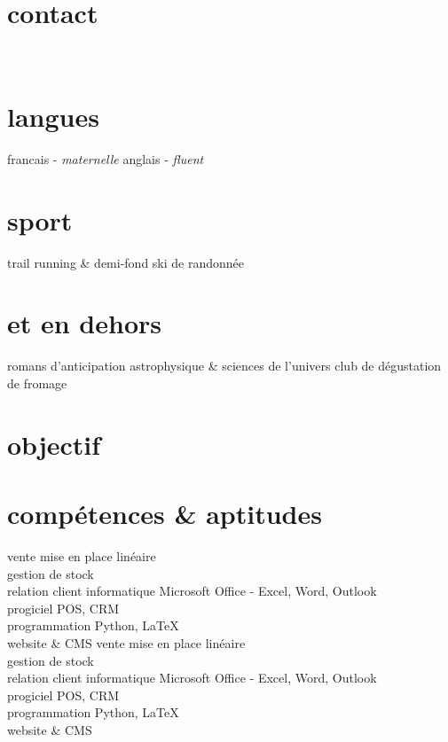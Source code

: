 \documentclass[]{farangoth-cv}
\begin{document}
\makeheader{}

\begin{aside}
  \section{contact}\label{sec:about}
  \myPhoneNumber{}
  ~
  \href{mailto:\myMail}{\myMail}
  \href{\myLinkedin}{}
  ~
  \myAddress{}

  \section{langues}
  francais \-- \emph{maternelle}
  anglais \-- \emph{fluent}
  
  \section{sport}
  trail running \& demi-fond
  ski de randonnée

  \section{et en dehors}
  romans d'anticipation
  astrophysique \& sciences de l'univers
  club de dégustation de fromage  
\end{aside}

\section{objectif}
\lipsum[2]

\section{compétences \& aptitudes}
\begin{entrylist}
  \doubleentry%
  {vente}{%
    mise en place linéaire\\
    gestion de stock\\
    relation client
  }
  {informatique}{%
    Microsoft Office \-- Excel, Word, Outlook\\
    progiciel POS, CRM\\
    programmation Python, \LaTeX\\
    website \& CMS
  }%
   \doubleentry%
  {vente}{%
    mise en place linéaire\\
    gestion de stock\\
    relation client
  }
  {informatique}{%
    Microsoft Office \-- Excel, Word, Outlook\\
    progiciel POS, CRM\\
    programmation Python, \LaTeX\\
    website \& CMS
  }%
  
\end{entrylist}
\end{document}
